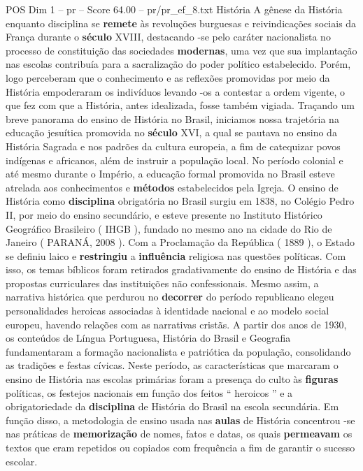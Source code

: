 \begin{textsample}{POS Dim 1 – pr – Score 64.00 – pr/pr\_ef\_8.txt}  \label{ex:f1_pos_030}
História A gênese da História enquanto disciplina se \textbf{remete} às revoluções burguesas e reivindicações sociais da França durante o \textbf{século} XVIII, destacando -se pelo caráter nacionalista no processo de constituição das sociedades \textbf{modernas}, uma vez que sua implantação nas escolas contribuía para a sacralização do poder político estabelecido.
Porém, logo perceberam que o conhecimento e as reflexões promovidas por meio da História empoderaram os indivíduos levando -os a contestar a ordem vigente, o que fez com que a História, antes idealizada, fosse também vigiada.
Traçando um breve panorama do ensino de História no Brasil, iniciamos nossa trajetória na educação jesuítica promovida no \textbf{século} XVI, a qual se pautava no ensino da História Sagrada e nos padrões da cultura europeia, a fim de catequizar povos indígenas e africanos, além de instruir a população local.
No período colonial e até mesmo durante o Império, a educação formal promovida no Brasil esteve atrelada aos conhecimentos e \textbf{métodos} estabelecidos pela Igreja.
O ensino de História como \textbf{disciplina} obrigatória no Brasil surgiu em 1838, no Colégio Pedro II, por meio do ensino secundário, e esteve presente no Instituto Histórico Geográfico Brasileiro ( IHGB ), fundado no mesmo ano na cidade do Rio de Janeiro ( PARANÁ, 2008 ).
Com a Proclamação da República ( 1889 ), o Estado se definiu laico e \textbf{restringiu} a \textbf{influência} religiosa nas questões políticas.
Com isso, os temas bíblicos foram retirados gradativamente do ensino de História e das propostas curriculares das instituições não confessionais.
Mesmo assim, a narrativa histórica que perdurou no \textbf{decorrer} do período republicano elegeu personalidades heroicas associadas à identidade nacional e ao modelo social europeu, havendo relações com as narrativas cristãs.
A partir dos anos de 1930, os conteúdos de Língua Portuguesa, História do Brasil e Geografia fundamentaram a formação nacionalista e patriótica da população, consolidando as tradições e festas cívicas.
Neste período, as características que marcaram o ensino de História nas escolas primárias foram a presença do culto às \textbf{figuras} políticas, os festejos nacionais em função dos feitos “ heroicos ” e a obrigatoriedade da \textbf{disciplina} de História do Brasil na escola secundária.
Em função disso, a metodologia de ensino usada nas \textbf{aulas} de História concentrou -se nas práticas de \textbf{memorização} de nomes, fatos e datas, os quais \textbf{permeavam} os textos que eram repetidos ou copiados com frequência a fim de garantir o sucesso escolar.

\end{textsample}
